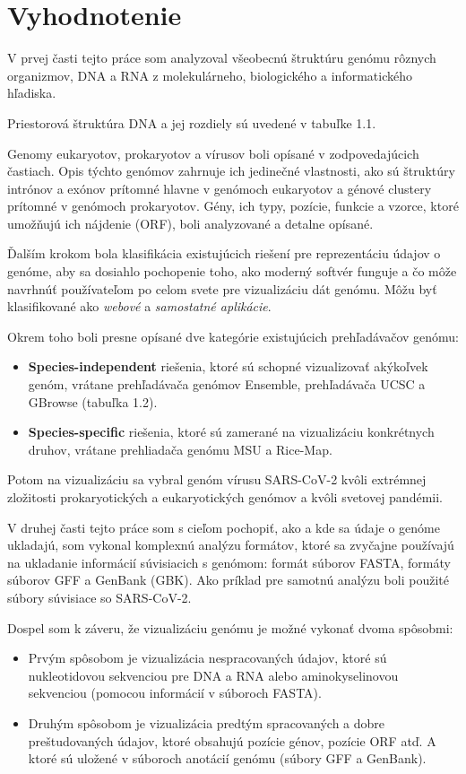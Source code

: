 
\chapter{Vyhodnotenie}

V prvej časti tejto práce som analyzoval všeobecnú štruktúru genómu rôznych organizmov, DNA a RNA z molekulárneho, biologického a informatického hľadiska.

Priestorová štruktúra DNA a jej rozdiely sú uvedené v tabuľke 1.1.

Genomy eukaryotov, prokaryotov a vírusov boli opísané v zodpovedajúcich častiach.
Opis týchto genómov zahrnuje ich jedinečné vlastnosti, ako sú štruktúry intrónov a exónov prítomné hlavne v genómoch eukaryotov a génové clustery prítomné v genómoch prokaryotov.
Gény, ich typy, pozície, funkcie a vzorce, ktoré umožňujú ich nájdenie (ORF), boli analyzované a detalne opísané.

Ďalším krokom bola klasifikácia existujúcich riešení pre reprezentáciu údajov o genóme, aby sa dosiahlo pochopenie toho, ako moderný softvér funguje a čo môže navrhnúť používateľom po celom svete pre vizualizáciu dát genómu.
Môžu byť klasifikované ako \textit{webové} a \textit{samostatné aplikácie}.

Okrem toho boli presne opísané dve kategórie existujúcich prehľadávačov genómu:
\begin{itemize}
    \item \textbf{Species-independent} riešenia, ktoré sú schopné vizualizovať akýkoľvek genóm, vrátane prehľadávača genómov Ensemble, prehľadávača UCSC a GBrowse (tabuľka 1.2).
    \item \textbf{Species-specific} riešenia, ktoré sú zamerané na vizualizáciu konkrétnych druhov, vrátane prehliadača genómu MSU a Rice-Map.
\end{itemize}

Potom na vizualizáciu sa vybral genóm vírusu SARS-CoV-2 kvôli extrémnej zložitosti prokaryotických a eukaryotických genómov a kvôli svetovej pandémii.

V druhej časti tejto práce som s cieľom pochopiť, ako a kde sa údaje o genóme ukladajú, som vykonal komplexnú analýzu formátov, ktoré sa zvyčajne používajú na ukladanie informácií súvisiacich s genómom: formát súborov FASTA, formáty súborov GFF a GenBank (GBK).
Ako príklad pre samotnú analýzu boli použité súbory súvisiace so SARS-CoV-2.

Dospel som k záveru, že vizualizáciu genómu je možné vykonať dvoma spôsobmi:
\begin{itemize}
    \item Prvým spôsobom je vizualizácia nespracovaných údajov, ktoré sú nukleotidovou sekvenciou pre DNA a RNA alebo aminokyselinovou sekvenciou (pomocou informácií v súboroch FASTA).
    \item Druhým spôsobom je vizualizácia predtým spracovaných a dobre preštudovaných údajov, ktoré obsahujú pozície génov, pozície ORF atď. A ktoré sú uložené v súboroch anotácií genómu (súbory GFF a GenBank).
\end{itemize}

